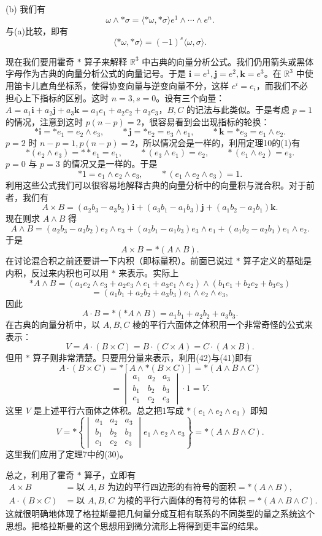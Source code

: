 (b) 我们有
\[
 \omega\wedge*\sigma=\langle*\omega,*\sigma\rangle e^1\wedge\cdots\wedge e^n.
\]
与(a)比较，即有
\[
 \langle*\omega,*\sigma\rangle=(-1)^s\langle\omega,\sigma\rangle.
\]

现在我们要用霍奇 $*$ 算子来解释 $\mathbb R^3$ 中古典的向量分析公式。我们仍用箭头或黑体字母作为古典的向量分析公式的向量记号。于是 $\mathbf i=e^1,\mathbf j=e^2,\mathbf k=e^3$。在 $\mathbb R^3$ 中使用笛卡儿直角坐标系，使得协变向量与逆变向量不分，这样 $e^i=e_i$，而我们不必担心上下指标的区别。这时 $n=3,s=0$。设有三个向量：$A=a_1\mathbf i+a_2\mathbf j+a_3\mathbf k=a_1e_1+a_2e_2+a_3e_3$，$B,C$ 的记法与此类似。于是考虑 $p=1$ 的情况，注意到这时 $p(n-p)=2$，很容易看到会出现指标的轮换：
\[
 *\mathbf i=*e_1=e_2\wedge e_3,
 \qquad *\mathbf j=*e_2=e_3\wedge e_1,
 \qquad *\mathbf k=*e_3=e_1\wedge e_2.
\]
$p=2$ 时 $n-p=1,p(n-p)=2$，所以情况会是一样的，利用定理10的(1)有
\[
 *(e_2\wedge e_3)=**e_1=e_1,
 \qquad *(e_3\wedge e_1)=e_2,
 \qquad *(e_1\wedge e_2)=e_3.
\]
$p=0$ 与 $p=3$ 的情况又是一样的。于是
\[
 *1=e_1\wedge e_2\wedge e_3,
 \qquad *(e_1\wedge e_2\wedge e_3)=1.
\]
利用这些公式我们可以很容易地解释古典的向量分析中的向量积与混合积。对于前者，我们有
\[
 A\times B=(a_2b_3-a_3b_2)\mathbf i+(a_3b_1-a_1b_3)\mathbf j+(a_1b_2-a_2b_1)\mathbf k.
\]
现在则求 $A\wedge B$ 得
\[
 A\wedge B=(a_2b_3-a_3b_2)e_2\wedge e_3+(a_3b_1-a_1b_3)e_3\wedge e_1+(a_1b_2-a_2b_1)e_1\wedge e_2.
\]
于是
\begin{equation}
 A\times B=*(A\wedge B).
 \tag{41}
\end{equation}
在讨论混合积之前还要讲一下内积（即标量积）。前面已说过 $*$ 算子定义的基础是内积，反过来内积也可以用 $*$ 来表示。实际上
\[
 *A\wedge B=(a_1e_2\wedge e_3+a_2e_3\wedge e_1+a_3e_1\wedge e_2)
 \wedge(b_1e_1+b_2e_2+b_3e_3)
\]
\[
 =(a_1b_1+a_2b_2+a_3b_3)e_1\wedge e_2\wedge e_3,
\]
因此
\begin{equation}
 A\cdot B=*(*A\wedge B)=a_1b_1+a_2b_2+a_3b_3.
 \tag{42}
\end{equation}
在古典的向量分析中，以 $A,B,C$ 棱的平行六面体之体积用一个非常奇怪的公式来表示：
\[
 V=A\cdot(B\times C)=B\cdot(C\times A)=C\cdot(A\times B).
\]
但用 $*$ 算子则非常清楚。只要用分量来表示，利用(42)与(41)即有
\[
 A\cdot(B\times C)=*[A\wedge*(B\times C)]=*(A\wedge B\wedge C)
\]
\[
 =\begin{vmatrix}a_1&a_2&a_3\\b_1&b_2&b_3\\c_1&c_2&c_3\end{vmatrix}\cdot1=V.
\]
这里 $V$ 是上述平行六面体之体积。总之把1写成 $*(e_1\wedge e_2\wedge e_3)$ 即知
\begin{equation}
 V=*\left\{\begin{vmatrix}a_1&a_2&a_3\\b_1&b_2&b_3\\c_1&c_2&c_3\end{vmatrix}e_1\wedge e_2\wedge e_3\right\}=*(A\wedge B\wedge C).
 \tag{43}
\end{equation}
这里我们应用了定理7中的(30)。

总之，利用了霍奇 $*$ 算子，立即有
\[
 \begin{aligned}
 A\times B&=\text{以 $A,B$ 为边的平行四边形的有符号的面积}=*(A\wedge B),\\
 A\cdot(B\times C)&=\text{以 $A,B,C$ 为棱的平行六面体的有符号的体积}=*(A\wedge B\wedge C).
 \end{aligned}
\]
这就很明确地体现了格拉斯曼把几何量分成互相有联系的不同类型的量之系统这个思想。把格拉斯曼的这个思想用到微分流形上将得到更丰富的结果。

